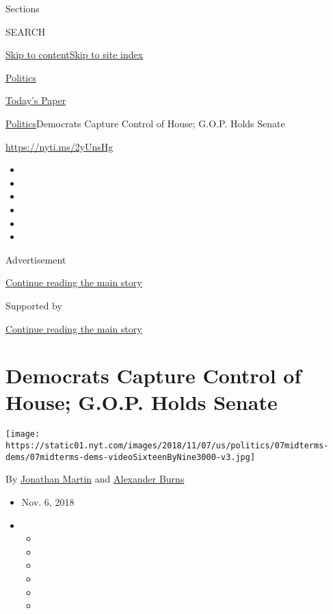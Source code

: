 Sections

SEARCH

\protect\hyperlink{site-content}{Skip to
content}\protect\hyperlink{site-index}{Skip to site index}

\href{https://www.nytimes.com/section/politics}{Politics}

\href{https://myaccount.nytimes.com/auth/login?response_type=cookie\&client_id=vi}{}

\href{https://www.nytimes.com/section/todayspaper}{Today's Paper}

\href{/section/politics}{Politics}\textbar{}Democrats Capture Control of
House; G.O.P. Holds Senate

\url{https://nyti.ms/2yUnsHg}

\begin{itemize}
\item
\item
\item
\item
\item
\item
\end{itemize}

Advertisement

\protect\hyperlink{after-top}{Continue reading the main story}

Supported by

\protect\hyperlink{after-sponsor}{Continue reading the main story}

\hypertarget{democrats-capture-control-of-house-gop-holds-senate}{%
\section{Democrats Capture Control of House; G.O.P. Holds
Senate}\label{democrats-capture-control-of-house-gop-holds-senate}}

\texttt{[image: https://static01.nyt.com/images/2018/11/07/us/politics/07midterms-dems/07midterms-dems-videoSixteenByNine3000-v3.jpg]}

By \href{https://www.nytimes.com/by/jonathan-martin}{Jonathan Martin}
and \href{https://www.nytimes.com/by/alexander-burns}{Alexander Burns}

\begin{itemize}
\item
  Nov. 6, 2018
\item
  \begin{itemize}
  \item
  \item
  \item
  \item
  \item
  \item
  \end{itemize}
\end{itemize}

